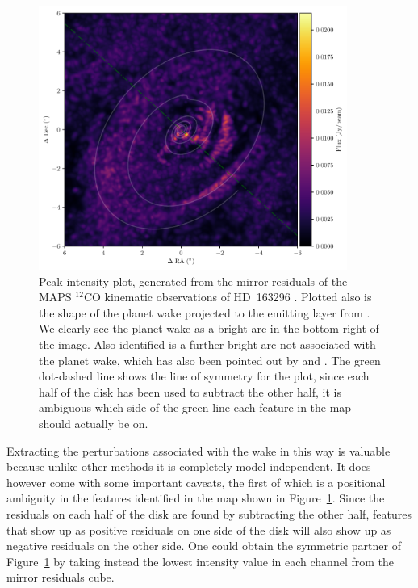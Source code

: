 \begin{figure}
    \centering
    \includegraphics[width = 0.9\textwidth]{figures/mirror_M8.pdf}
    \caption{Peak intensity plot, generated from the mirror residuals of the MAPS $^{12}$CO kinematic observations of HD~163296 \citep{oberg2021}. Plotted also is the shape of the planet wake projected to the emitting layer from \citet{calcino2022}. We clearly see the planet wake as a bright arc in the bottom right of the image. Also identified is a further bright arc not associated with the planet wake, which has also been pointed out by \citet{teague2021} and \citet{calcino2022}. The green dot-dashed line shows the line of symmetry for the plot, since each half of the disk has been used to subtract the other half, it is ambiguous which side of the green line each feature in the map should actually be on.}
    \label{fig:mirror_M8}
\end{figure}

Extracting the perturbations associated with the wake in this way is valuable because unlike other methods \citep{teague2021,teague2022} it is completely model-independent.
It does however come with some important caveats, the first of which is a positional ambiguity in the features identified in the map shown in Figure~\ref{fig:mirror_M8}.
Since the residuals on each half of the disk are found by subtracting the other half, features that show up as positive residuals on one side of the disk will also show up as negative residuals on the other side.
One could obtain the symmetric partner of Figure~\ref{fig:mirror_M8} by taking instead the lowest intensity value in each channel from the mirror residuals cube.

